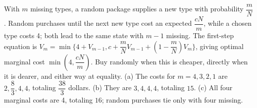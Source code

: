 With $m$ missing types, a random package supplies a new type with probability $\dfrac{m}{N}$. Random purchases until the next new type cost an expected $\dfrac{cN}{m}$, while a chosen type costs 4; both lead to the same state with $m-1$ missing. The first-step equation is $V_m=\min\{4+V_{m-1},c+\dfrac{m}{N} V_{m-1}+(1-\dfrac{m}{N})V_m\}$, giving optimal marginal cost $\min(4,\dfrac{cN}{m})$. Buy randomly when this is cheaper, directly when it is dearer, and either way at equality. (a) The costs for $m=4,3,2,1$ are $2,\dfrac{8}{3},4,4$, totaling $\boxed{\dfrac{38}{3}}$ dollars. (b) They are $3,4,4,4$, totaling $\boxed{15}$. (c) All four marginal costs are 4, totaling $\boxed{16}$; random purchases tie only with four missing.
